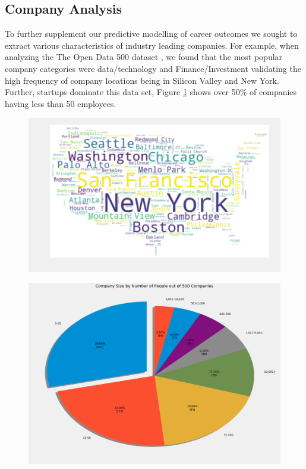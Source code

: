 \subsection{Company Analysis}
To further supplement our predictive modelling of career outcomes we sought to extract various characteristics of industry leading companies. For example, when analyzing the The Open Data 500 dataset \cite{kaggleCompanies}, we found that the most popular company categories were data/technology and Finance/Investment validating the high frequency of company locations being in Silicon Valley and New York. Further, startups dominate this data set, Figure \ref{fig:test6} shows over 50\% of companies having less than 50 employees. \\
\begin{figure}
	\centering
	\begin{minipage}{.5\textwidth}
		\centering
		\includegraphics[width=.8\linewidth]{images/company_loc.png}
		\label{fig:test5}
	\end{minipage}%
	\begin{minipage}{.5\textwidth}
		\centering
		\includegraphics[width=.8\linewidth]{images/company_size.png}
		\label{fig:test6}
	\end{minipage}
\end{figure}

